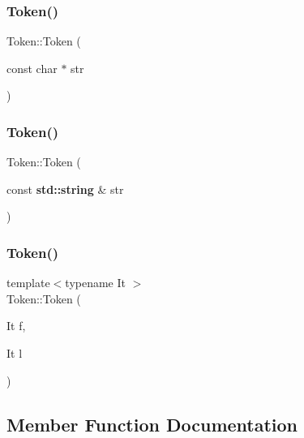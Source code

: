 \mbox{\label{class_token_a14690319b7df185a3899d4b2aedb59dc}} 
\subsubsection{\texorpdfstring{Token()}{Token()}\hspace{0.1cm}{\footnotesize\ttfamily [4/6]}}
{\footnotesize\ttfamily Token\+::\+Token (\begin{DoxyParamCaption}\item[{const char $\ast$}]{str }\end{DoxyParamCaption})}

\mbox{\label{class_token_a213c87418a6ff6375ab2298ee93acf43}} 
\subsubsection{\texorpdfstring{Token()}{Token()}\hspace{0.1cm}{\footnotesize\ttfamily [5/6]}}
{\footnotesize\ttfamily Token\+::\+Token (\begin{DoxyParamCaption}\item[{const \textbf{ std\+::string} \&}]{str }\end{DoxyParamCaption})}

\mbox{\label{class_token_a3b8654007e4cd9b3074dbe8300cf67bf}} 
\subsubsection{\texorpdfstring{Token()}{Token()}\hspace{0.1cm}{\footnotesize\ttfamily [6/6]}}
{\footnotesize\ttfamily template$<$typename It $>$ \\
Token\+::\+Token (\begin{DoxyParamCaption}\item[{It}]{f,  }\item[{It}]{l }\end{DoxyParamCaption})\hspace{0.3cm}{\ttfamily [inline]}}



\subsection{Member Function Documentation}
\mbox{\label{class_token_a45256af5fdc822d729ec7294d4edf52d}} 
